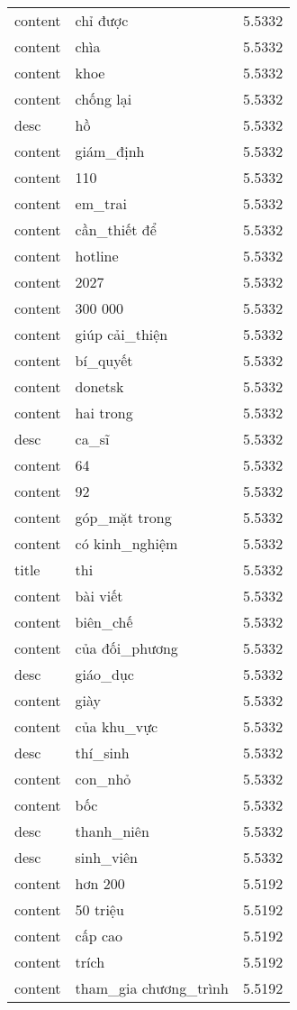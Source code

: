 \documentclass{article}
\begin{document}
\begin{tabular}{lll}
content & chỉ được & 5.5332\\
content & chìa & 5.5332\\
content & khoe & 5.5332\\
content & chống lại & 5.5332\\
desc & hồ & 5.5332\\
content & giám\_định & 5.5332\\
content & 110 & 5.5332\\
content & em\_trai & 5.5332\\
content & cần\_thiết để & 5.5332\\
content & hotline & 5.5332\\
content & 2027 & 5.5332\\
content & 300 000 & 5.5332\\
content & giúp cải\_thiện & 5.5332\\
content & bí\_quyết & 5.5332\\
content & donetsk & 5.5332\\
content & hai trong & 5.5332\\
desc & ca\_sĩ & 5.5332\\
content & 64 & 5.5332\\
content & 92 & 5.5332\\
content & góp\_mặt trong & 5.5332\\
content & có kinh\_nghiệm & 5.5332\\
title & thi & 5.5332\\
content & bài viết & 5.5332\\
content & biên\_chế & 5.5332\\
content & của đối\_phương & 5.5332\\
desc & giáo\_dục & 5.5332\\
content & giày & 5.5332\\
content & của khu\_vực & 5.5332\\
desc & thí\_sinh & 5.5332\\
content & con\_nhỏ & 5.5332\\
content & bốc & 5.5332\\
desc & thanh\_niên & 5.5332\\
desc & sinh\_viên & 5.5332\\
content & hơn 200 & 5.5192\\
content & 50 triệu & 5.5192\\
content & cấp cao & 5.5192\\
content & trích & 5.5192\\
content & tham\_gia chương\_trình & 5.5192\\

\end{tabular}
\end{document}
